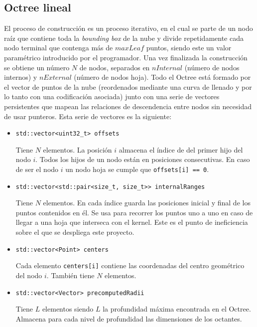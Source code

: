 \subsection{Octree lineal}
El proceso de construcción es un proceso iterativo, en el cual se parte de un nodo raíz que contiene toda la \textit{bounding box} de la nube y divide repetidamente cada nodo terminal que contenga más de $maxLeaf$ puntos, siendo este un valor paramétrico introducido por el programador. 
Una vez finalizada la construcción se obtiene un número $N$ de nodos, separados en $nInternal$ (número de nodos internos) y $nExternal$ (número de nodos hoja). Todo el Octree está formado por el vector de puntos de la nube (reordenados mediante una curva de llenado y por lo tanto con una codificación asociada) junto con una serie de vectores persistentes que mapean las relaciones de descendencia entre nodos sin necesidad de usar punteros. Esta serie de vectores es la siguiente:

\begin{itemize}
    \item \texttt{std::vector<uint32\_t> offsets}

    Tiene $N$ elementos. La posición $i$ almacena el índice de del primer hijo del nodo $i$. Todos los hijos de un nodo están en posiciones consecutivas. En caso de ser el nodo $i$ un nodo hoja se cumple que \texttt{offsets[i] == 0}.

    \item \texttt{std::vector<std::pair<size\_t, size\_t>\>> internalRanges}
    
    Tiene $N$ elementos. En cada índice guarda las posiciones inicial y final de los puntos contenidos en él. Se usa para recorrer los puntos uno a uno en caso de llegar a una hoja que interseca con el kernel. Este es el punto de ineficiencia sobre el que se despliega este proyecto.

    \item \texttt{std::vector<Point> centers}   
    
    Cada elemento \texttt{centers[i]} contiene las coordenadas del centro geométrico del nodo $i$. También tiene $N$ elementos.

    \item \texttt{std::vector<Vector> precomputedRadii}   
    
    Tiene $L$ elementos siendo $L$ la profundidad máxima encontrada en el Octree. Almacena para cada nivel de profundidad las dimensiones de los octantes.

\end{itemize}

